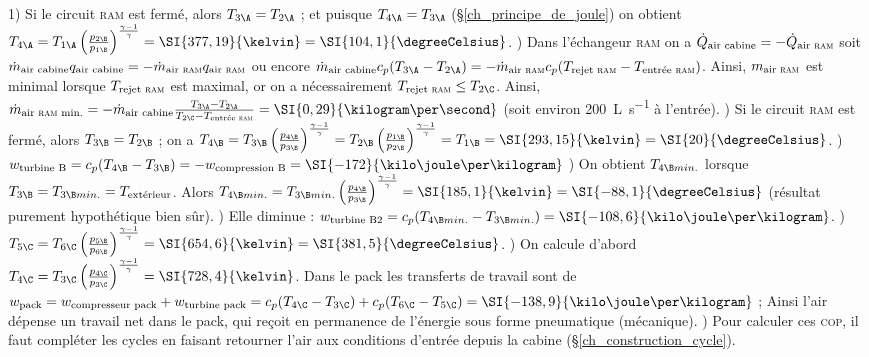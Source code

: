 \begin{description}
			\tab\onlyframabook{\tab} 1) Si le circuit \textsc{ram} est fermé, alors $T_{3\A} = T_{2\A}$ ; et puisque $T_{4\A} = T_{3\A}$ (\S\ref{ch_principe_de_joule}) on obtient $T_{4\A}
			= T_{1\A} \left(\frac{p_{2\B}}{p_{1\B}}\right)^{\frac{\gamma-1}{\gamma}}
			= \SI{377,19}{\kelvin} = \SI{104,1}{\degreeCelsius}$.%
			) Dans l’échangeur \textsc{ram} on a
				$\dot Q_\text{air cabine} = - \dot Q_\text{air \textsc{ram}}$ soit
				$\dot m_\text{air cabine} q_\text{air cabine} =  -\dot m_\text{air \textsc{ram}} q_\text{air \textsc{ram}}$ ou encore
				$\dot m_\text{air cabine} c_p(T_{3\A} - T_{2\A}) = -\dot m_\text{air \textsc{ram}} c_p(T_\text{rejet \textsc{ram}} - T_\text{entrée \textsc{ram}})$. Ainsi, $m_\text{air \textsc{ram}}$ est minimal lorsque $T_\text{rejet \textsc{ram}}$ est maximal, or on a nécessairement $T_\text{rejet \textsc{ram}} \leq T_{2\C}$. Ainsi,
				$\dot m_\text{air \textsc{ram} min.} = -\dot m_\text{air cabine} \frac{T_{3\A} - T_{2\A}}{T_{2\C} - T_\text{entrée \textsc{ram}}} = \SI{0,29}{\kilogram\per\second}$ (soit environ \SI{200}{\liter\per\second} à l’entrée).				
			) Si le circuit \textsc{ram} est fermé, alors $T_{3\B} = T_{2\B}$ ; on a $T_{4\B}
			= T_{3\B} \left(\frac{p_{4\B}}{p_{3\B}}\right)^{\frac{\gamma-1}{\gamma}}
			= T_{2\B} \left(\frac{p_{1\B}}{p_{2\B}}\right)^{\frac{\gamma-1}{\gamma}}
			= T_{1\B} = \SI{293,15}{\kelvin} = \SI{20}{\degreeCelsius}$.
			) $w_\text{turbine B} = c_p (T_{4\B} - T_{3\B}) = -w_\text{compression B} = \SI{-172}{\kilo\joule\per\kilogram}$
			) On obtient $T_{4\B min.}$ lorsque $T_{3\B} = T_{3\B min.} = T_\text{extérieur}$. Alors $T_{4\B min.} = T_{3\B min.} \left(\frac{p_{4\B}}{p_{3\B}}\right)^{\frac{\gamma-1}{\gamma}} = \SI{185,1}{\kelvin} = \SI{-88,1}{\degreeCelsius}$ (résultat purement hypothétique bien sûr).
			) Elle diminue : $w_\text{turbine B2} = c_p (T_{4\B min.} - T_{3\B min.}) = \SI{-108,6}{\kilo\joule\per\kilogram}$.
			) $T_{5\C} = T_{6\C} \left(\frac{p_{5\B}}{p_{6\B}}\right)^{\frac{\gamma-1}{\gamma}} = \SI{654,6}{\kelvin} = \SI{381,5}{\degreeCelsius}$.
			) On calcule d’abord $T_{4\C} = T_{3\C} \left(\frac{p_{4\C}}{p_{3\C}}\right)^{\frac{\gamma-1}{\gamma}} = \SI{728,4}{\kelvin}$. Dans le pack les transferts de travail sont de $w_\text{pack}
			= w_\text{compresseur pack} + w_\text{turbine pack}
			= c_p(T_{4\C} - T_{3\C}) + c_p(T_{6\C} - T_{5\C})
			= \SI{-138,9}{\kilo\joule\per\kilogram}$ ;
			Ainsi l’air dépense un travail net dans le pack, qui reçoit en permanence de l’énergie sous forme pneumatique (mécanique).
			) Pour calculer ces \textsc{cop}, il faut compléter les cycles en faisant retourner l’air aux conditions d’entrée depuis la cabine (\S\ref{ch_construction_cycle}).

\end{description}
